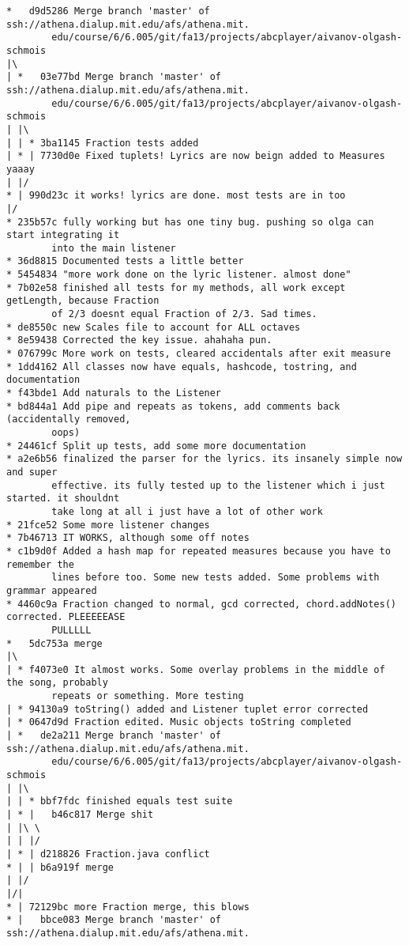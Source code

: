 \documentclass[12pt]{book}
\begin{document}
\begin{Verbatim}
*   d9d5286 Merge branch 'master' of ssh://athena.dialup.mit.edu/afs/athena.mit.
        edu/course/6/6.005/git/fa13/projects/abcplayer/aivanov-olgash-schmois
|\
| *   03e77bd Merge branch 'master' of ssh://athena.dialup.mit.edu/afs/athena.mit.
        edu/course/6/6.005/git/fa13/projects/abcplayer/aivanov-olgash-schmois
| |\
| | * 3ba1145 Fraction tests added
| * | 7730d0e Fixed tuplets! Lyrics are now beign added to Measures yaaay
| |/
* | 990d23c it works! lyrics are done. most tests are in too
|/
* 235b57c fully working but has one tiny bug. pushing so olga can start integrating it 
        into the main listener
* 36d8815 Documented tests a little better
* 5454834 "more work done on the lyric listener. almost done"
* 7b02e58 finished all tests for my methods, all work except getLength, because Fraction 
        of 2/3 doesnt equal Fraction of 2/3. Sad times.
* de8550c new Scales file to account for ALL octaves
* 8e59438 Corrected the key issue. ahahaha pun.
* 076799c More work on tests, cleared accidentals after exit measure
* 1dd4162 All classes now have equals, hashcode, tostring, and documentation
* f43bde1 Add naturals to the Listener
* bd844a1 Add pipe and repeats as tokens, add comments back (accidentally removed, 
        oops)
* 24461cf Split up tests, add some more documentation
* a2e6b56 finalized the parser for the lyrics. its insanely simple now and super 
        effective. its fully tested up to the listener which i just started. it shouldnt 
        take long at all i just have a lot of other work
* 21fce52 Some more listener changes
* 7b46713 IT WORKS, although some off notes
* c1b9d0f Added a hash map for repeated measures because you have to remember the 
        lines before too. Some new tests added. Some problems with grammar appeared
* 4460c9a Fraction changed to normal, gcd corrected, chord.addNotes() corrected. PLEEEEEASE 
        PULLLLL
*   5dc753a merge
|\
| * f4073e0 It almost works. Some overlay problems in the middle of the song, probably 
        repeats or something. More testing
| * 94130a9 toString() added and Listener tuplet error corrected
| * 0647d9d Fraction edited. Music objects toString completed
| *   de2a211 Merge branch 'master' of ssh://athena.dialup.mit.edu/afs/athena.mit.
        edu/course/6/6.005/git/fa13/projects/abcplayer/aivanov-olgash-schmois
| |\
| | * bbf7fdc finished equals test suite
| * |   b46c817 Merge shit
| |\ \
| | |/
| * | d218826 Fraction.java conflict
* | | b6a919f merge
| |/
|/|
* | 72129bc more Fraction merge, this blows
* |   bbce083 Merge branch 'master' of ssh://athena.dialup.mit.edu/afs/athena.mit.

\end{Verbatim}
\end{document}

